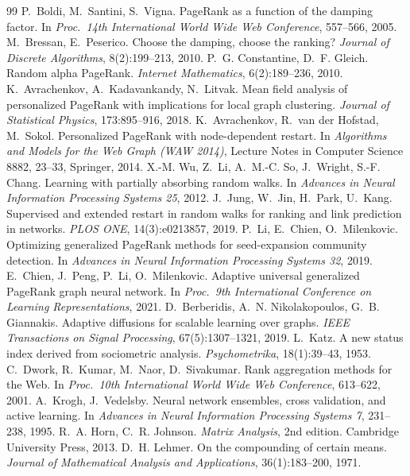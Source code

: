 \documentclass[11pt,a4paper]{article}
\theoremstyle{definition}
\theoremstyle{plain}
\begin{document}
\begin{thebibliography}{99}
 P.~Boldi, M.~Santini, S.~Vigna. PageRank as a function of the damping factor. In \emph{Proc.\ 14th International World Wide Web Conference}, 557--566, 2005.
 M.~Bressan, E.~Peserico. Choose the damping, choose the ranking? \emph{Journal of Discrete Algorithms}, 8(2):199--213, 2010.
 P.~G. Constantine, D.~F. Gleich. Random alpha PageRank. \emph{Internet Mathematics}, 6(2):189--236, 2010.
 K.~Avrachenkov, A.~Kadavankandy, N.~Litvak. Mean field analysis of personalized PageRank with implications for local graph clustering. \emph{Journal of Statistical Physics}, 173:895--916, 2018.
 K.~Avrachenkov, R.~van der Hofstad, M.~Sokol. Personalized PageRank with node-dependent restart. In \emph{Algorithms and Models for the Web Graph (WAW 2014)}, Lecture Notes in Computer Science 8882, 23--33, Springer, 2014.
 X.-M. Wu, Z.~Li, A.~M.-C. So, J.~Wright, S.-F. Chang. Learning with partially absorbing random walks. In \emph{Advances in Neural Information Processing Systems 25}, 2012.
 J.~Jung, W.~Jin, H.~Park, U.~Kang. Supervised and extended restart in random walks for ranking and link prediction in networks. \emph{PLOS ONE}, 14(3):e0213857, 2019.
 P.~Li, E.~Chien, O.~Milenkovic. Optimizing generalized PageRank methods for seed-expansion community detection. In \emph{Advances in Neural Information Processing Systems 32}, 2019.
 E.~Chien, J.~Peng, P.~Li, O.~Milenkovic. Adaptive universal generalized PageRank graph neural network. In \emph{Proc.\ 9th International Conference on Learning Representations}, 2021.
 D.~Berberidis, A.~N. Nikolakopoulos, G.~B. Giannakis. Adaptive diffusions for scalable learning over graphs. \emph{IEEE Transactions on Signal Processing}, 67(5):1307--1321, 2019.
 L.~Katz. A new status index derived from sociometric analysis. \emph{Psychometrika}, 18(1):39--43, 1953.
 C.~Dwork, R.~Kumar, M.~Naor, D.~Sivakumar. Rank aggregation methods for the Web. In \emph{Proc.\ 10th International World Wide Web Conference}, 613--622, 2001.
 A.~Krogh, J.~Vedelsby. Neural network ensembles, cross validation, and active learning. In \emph{Advances in Neural Information Processing Systems 7}, 231--238, 1995.
 R.~A. Horn, C.~R. Johnson. \emph{Matrix Analysis}, 2nd edition. Cambridge University Press, 2013.
 D.~H. Lehmer. On the compounding of certain means. \emph{Journal of Mathematical Analysis and Applications}, 36(1):183--200, 1971.

\end{thebibliography}
\end{document}

